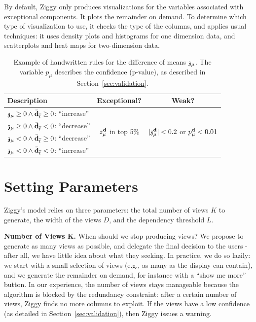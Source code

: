 By default, Ziggy only produces visualizations for the variables associated
with exceptional components. It plots the remainder on demand. To determine
which type of visualization to use, it checks the type of the columns, and
applies usual techniques: it uses density plots and histograms for one
dimension data, and scatterplots and heat maps for two-dimension data.
\begin{table}[t!]
    \centering
    \begin{tabular}{| p{4cm} | c | c |}
      \hline
      Description & Exceptional? & Weak?\\
      \hline
      $\mathfrak{z_\mu} \geq 0 \wedge \bar{\mathbf{d}}_{\overline{t}} \geq 0$: ``increase'' &
          \multirow{4}{1.2cm}{$z_\mu^{\bf{d}}$ in top 5\%} & 
              \multirow{4}{1.5cm}{$|\mathfrak{z_\mu^{\bf{d}}}| < 0.2$ or $p_\mu^{\bf{d}} < 0.01$}\\
      $\mathfrak{z_\mu} \geq 0 \wedge \bar{\mathbf{d}}_{\overline{t}} < 0$: ``decrease'' & &\\
      $\mathfrak{z_\mu} < 0 \wedge \bar{\mathbf{d}}_{\overline{t}} \geq0$: ``decrease'' & &\\
      $\mathfrak{z_\mu} < 0 \wedge \bar{\mathbf{d}}_{\overline{t}} < 0$: ``increase'' & &\\
      \hline
    \end{tabular}
    \caption{Example of handwritten rules for the difference of means
    $\mathfrak{z_\mu}$. The variable $p_\mu$ describes the confidence (p-value), as
described in Section~\ref{sec:validation}.} 
\label{tab:handwritten}
\end{table}


\section{Setting Parameters}
\label{sec:parameters}

Ziggy's model relies on three parameters: the total number of views $K$ to
generate, the width of the views $D$, and the dependency threshold $L$. 

\textbf{Number of Views K.} When should we stop producing views? We propose to
generate as many views as possible, and delegate the final decision to the
users - after all, we have little idea about what they seeking. In practice, we
do so lazily: we start with a small selection of views (e.g., as many as
the display can contain), and we generate the remainder on demand, for instance
with a ``show me more'' button.  In our experience, the number of views stays
manageable because the algorithm is blocked by the redundancy constraint: after
a certain number of views, Ziggy finds no more columns to exploit. If the views
have a low confidence (as detailed in Section~\ref{sec:validation}), then Ziggy
issues a warning.

